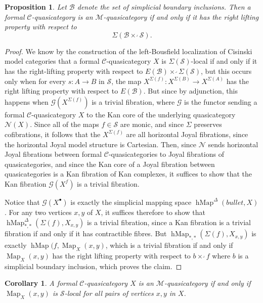 \documentclass{amsart}
\numberwithin{equation}{section}
\theoremstyle{plain}   %
\newtheorem{prop}[subsection]{Proposition}
\newtheorem{cor}[subsection]{Corollary}
\theoremstyle{remark}
\theoremstyle{plain}
\DeclareMathOperator{\Map}{Map}
\newcommand{\C}{\ensuremath{\mathcal{C}}}
\newcommand{\M}{\ensuremath{\mathcal{M}}}
\newcommand{\setS}{\ensuremath{\mathscr{S}}}
\begin{document}
\begin{prop} Let \(\mathscr{B}\) denote the set of simplicial boundary inclusions.  Then a formal \(\C\)-quasicategory is an \(\M\)-quasicategory if and only if it has the right lifting property with respect to \[\Sigma(\mathscr{B}\times^\lrcorner \setS).\]
\end{prop}
\begin{proof} 
  We know by the construction of the left-Bousfield localization of Cisinski model categories that a formal \(\C\)-quasicategory \(X\) is \(\Sigma(\setS)\)-local if and only if it has the right-lifting property with respect to \(E(\mathscr{B})\times^\lrcorner \Sigma(\setS)\), but this occurs only when for every \(s:A\to B\) in \(\setS\), the map \(X^{\Sigma(f)}:X^{\Sigma(B)} \to X^{\Sigma(A)}\) has the right lifting property with respect to \(E(\mathscr{B})\).  But since by adjunction, this happens when \(\mathscr{G}(X^{\Sigma(f)})\) is a trivial fibration, where \(\mathscr{G}\) is the functor sending a formal \(\C\)-quasicategory \(X\) to the Kan core of the underlying quasicategory \(\mathscr{N}(X)\).  Since all of the maps \(f \in \setS\) are monic, and since \(\Sigma\) preserves cofibrations, it follows that the \(X^{\Sigma(f)}\) are all horizontal Joyal fibrations, since the horizontal Joyal model structure is Cartesian.  Then, since \(\mathscr{N}\) sends horizontal Joyal fibrations between formal \(\C\)-quasicategories to Joyal fibrations of quasicategories, and since the Kan core of a Joyal fibration between quasicategories is a Kan fibration of Kan complexes, it suffices to show that the Kan fibration \(\mathscr{G}(X^f)\) is a trivial fibration. 
  
  Notice that \(\mathscr{G}(X^{\bullet})\) is exactly the simplicial mapping space \(\operatorname{hMap}^\Delta(bullet,X)\).  For any two vertices \(x,y\) of \(X\), it suffices therefore to show that \(\operatorname{hMap}^\Delta_{\ast,\ast}(\Sigma(f),X_{x,y})\) is a trivial fibration, since a Kan fibration is a trivial fibration if and only if it has contractible fibres.  But \(\operatorname{hMap}_{\ast,\ast}(\Sigma(f),X_{x,y})\) is exactly \(\operatorname{hMap}(f,\Map_X(x,y)\), which is a trivial fibration if and only if \(\Map_X(x,y)\) has the right lifting property with respect to \(b \times^\lrcorner f\) where \(b\) is a simplicial boundary inclusion, which proves the claim.
\end{proof}
\begin{cor} A formal \(\C\)-quasicategory \(X\) is an \(\M\)-quasicategory if and only if \(\Map_X(x,y)\) is \(\setS\)-local for all pairs of vertices \(x,y\) in \(X\).  
\end{cor}
\end{document}
